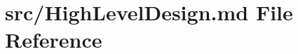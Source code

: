 \hypertarget{_high_level_design_8md}{}\section{src/\+High\+Level\+Design.md File Reference}
\label{_high_level_design_8md}
